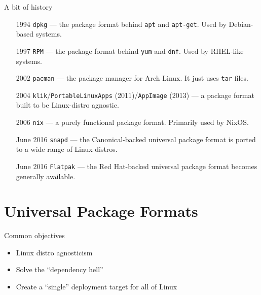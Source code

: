 \documentclass{lug}
\begin{document}
\begin{frame}{A bit of history}
    \begin{enumerate}[leftmargin=2cm]
        \item[1994] \texttt{dpkg} --- the package format behind \texttt{apt} and
            \texttt{apt-get}.  Used by Debian-based systems.
        \item[1997] \texttt{RPM} --- the package format behind \texttt{yum} and
            \texttt{dnf}. Used by RHEL-like systems.
        \item[2002] \texttt{pacman} --- the package manager for Arch Linux. It
            just uses \texttt{tar} files.
        \item[2004] \texttt{klik}/\texttt{PortableLinuxApps}
            (2011)/\texttt{AppImage} (2013) --- a package format built to be
            Linux-distro agnostic.
        \item[2006] \texttt{nix} --- a purely functional package format.
            Primarily used by NixOS.
        \item[June 2016] \texttt{snapd} --- the Canonical-backed universal
            package format is ported to a wide range of Linux distros.
        \item[June 2016] \texttt{Flatpak} --- the Red Hat-backed universal
            package format becomes generally available.
    \end{enumerate}
\end{frame}

\section{Universal Package Formats}
\begin{frame}{Common objectives}
    \begin{itemize}
        \item Linux distro agnosticism
        \item Solve the ``dependency hell''
        \item Create a ``single'' deployment target for all of Linux
    \end{itemize}
\end{frame}
\end{document}
